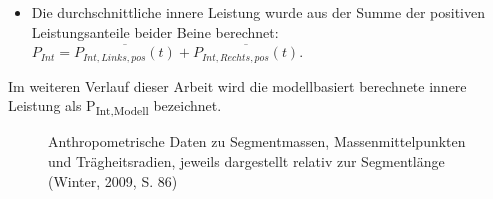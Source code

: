 \documentclass[
  letterpaper,
  DIV=11]{scrartcl}
\providecommand{\tightlist}{%
  \setlength{\itemsep}{0pt}\setlength{\parskip}{0pt}}\usepackage{longtable,booktabs,array}
\begin{document}
\begin{itemize}
\tightlist
\item
  Die durchschnittliche innere Leistung wurde aus der Summe der
  positiven Leistungsanteile beider Beine berechnet:
  \(P_{Int} = \overline{P_{Int,Links,pos}(t)} + \overline{P_{Int,Rechts,pos}(t)}\).
\end{itemize}

Im weiteren Verlauf dieser Arbeit wird die modellbasiert berechnete
innere Leistung als P\textsubscript{Int,Modell} bezeichnet.

\begin{tcolorbox}[enhanced jigsaw, colback=white, bottomrule=.15mm, title=\textcolor{quarto-callout-note-color}{\faInfo}\hspace{0.5em}{Abbildung 10: Anthropometrische Daten zu Segmentmassen,
Massenmittelpunkten und Trägheitsradien}, toptitle=1mm, colbacktitle=quarto-callout-note-color!10!white, toprule=.15mm, rightrule=.15mm, arc=.35mm, leftrule=.75mm, left=2mm, breakable, bottomtitle=1mm, colframe=quarto-callout-note-color-frame, titlerule=0mm, opacityback=0, coltitle=black, opacitybacktitle=0.6]

\begin{figure}[H]


\caption{\label{fig-Segmentmassen_Winter}Anthropometrische Daten zu
Segmentmassen, Massenmittelpunkten und Trägheitsradien, jeweils
dargestellt relativ zur Segmentlänge (Winter, 2009, S. 86)}

\end{figure}%

\end{tcolorbox}
\end{document}
